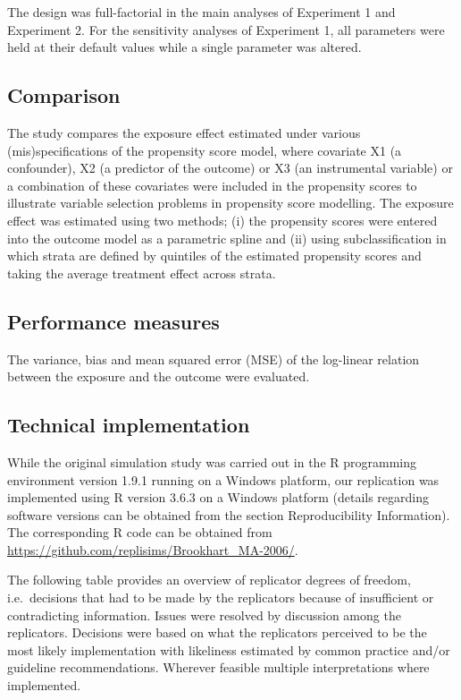 \documentclass[10,a4paperpaper,]{article}
\begin{document}
The design was full-factorial in the main analyses of Experiment 1 and
Experiment 2. For the sensitivity analyses of Experiment 1, all
parameters were held at their default values while a single parameter
was altered.

\subsection{Comparison}

The study compares the exposure effect estimated under various
(mis)specifications of the propensity score model, where covariate X1 (a
confounder), X2 (a predictor of the outcome) or X3 (an instrumental
variable) or a combination of these covariates were included in the
propensity scores to illustrate variable selection problems in
propensity score modelling. The exposure effect was estimated using two
methods; (i) the propensity scores were entered into the outcome model
as a parametric spline and (ii) using subclassification in which strata
are defined by quintiles of the estimated propensity scores and taking
the average treatment effect across strata.

\subsection{Performance measures}

The variance, bias and mean squared error (MSE) of the log-linear
relation between the exposure and the outcome were evaluated.

\subsection{Technical implementation}

While the original simulation study was carried out in the R programming
environment version 1.9.1 running on a Windows platform, our replication
was implemented using R version 3.6.3 on a Windows platform (details
regarding software versions can be obtained from the section
Reproducibility Information). The corresponding R code can be obtained
from \url{https://github.com/replisims/Brookhart_MA-2006/}.

The following table provides an overview of replicator degrees of
freedom, i.e.~decisions that had to be made by the replicators because
of insufficient or contradicting information. Issues were resolved by
discussion among the replicators. Decisions were based on what the
replicators perceived to be the most likely implementation with
likeliness estimated by common practice and/or guideline
recommendations. Wherever feasible multiple interpretations where
implemented.
\end{document}
